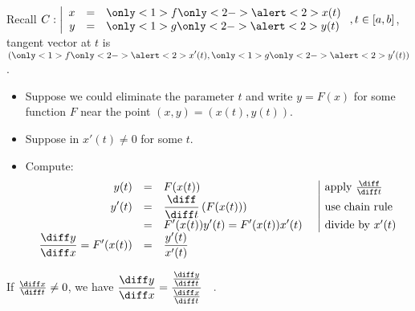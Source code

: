 \begin{frame}
Recall $C:\left|\begin{array}{rcl}x&=&\only<1>{f}\only<2->{\alert<2>{x}}(t)\\y&=& \only<1>{g}\only<2->{\alert<2>{y}}(t)\end{array} \right., t\in [a,b]$, tangent vector at $t$ is $(\only<1>{f}\only<2->{\alert<2>{x}}'(t), \only<1>{g}\only<2->{\alert<2>{y}}'(t))$. 

\begin{itemize}
\item<3-> Suppose we could eliminate the parameter $t$ and write $y=F(x)$ for some function $F$ near the point $(x,y)=(x(t), y(t))$. 
\item<4-> Suppose in $x'(t)\neq 0$ for some $t$. 
\item<5-> Compute:
\[
\begin{array}{rcll|l}
\displaystyle y(t)&=&\displaystyle  F(x(t)) &&\text{apply } \frac{\diff }{\diff t}\\
\displaystyle y'(t)&=&\displaystyle \frac{\diff} {\diff t} \left(F(x(t))\right)&&\text{use chain rule}\\
&=&\displaystyle  F'(x(t)) y'(t)=F'(x(t))x'(t) &&\text{divide by } x'(t)\\
\displaystyle \frac{\diff y}{\diff x}=F'(x(t)) &=&\displaystyle  \frac{y'(t) }{x'(t)}
\end{array}
\] 
\end{itemize}
\begin{observation}
If $\frac{\diff x}{\diff t}\neq 0$, we have $\displaystyle
\frac{\diff y}{\diff x}= \frac{\frac{\diff y}{\diff t}}{\frac{\diff x}{\diff t}}\quad .
$
\end{observation}
\end{frame}
